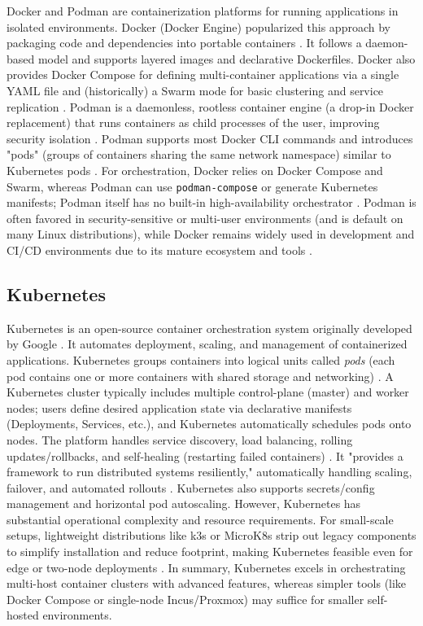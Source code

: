 Docker and Podman are containerization platforms for running applications in isolated environments. Docker (Docker Engine) popularized this approach by packaging code and dependencies into portable containers \cite{SpaceliftPodmanDocker2024}. It follows a daemon-based model and supports layered images and declarative Dockerfiles. Docker also provides Docker Compose for defining multi-container applications via a single YAML file and (historically) a Swarm mode for basic clustering and service replication \cite{SpaceliftPodmanDocker2024}. Podman is a daemonless, rootless container engine (a drop-in Docker replacement) that runs containers as child processes of the user, improving security isolation \cite{SpaceliftPodmanDocker2024}. Podman supports most Docker CLI commands and introduces "pods" (groups of containers sharing the same network namespace) similar to Kubernetes pods \cite{SpaceliftPodmanDocker2024}. For orchestration, Docker relies on Docker Compose and Swarm, whereas Podman can use \texttt{podman-compose} or generate Kubernetes manifests; Podman itself has no built-in high-availability orchestrator \cite{SpaceliftPodmanDocker2024}. Podman is often favored in security-sensitive or multi-user environments (and is default on many Linux distributions), while Docker remains widely used in development and CI/CD environments due to its mature ecosystem and tools \cite{SpaceliftPodmanDocker2024}.

\subsection*{Kubernetes}

Kubernetes is an open-source container orchestration system originally developed by Google \cite{KubernetesHome2023}. It automates deployment, scaling, and management of containerized applications. Kubernetes groups containers into logical units called \emph{pods} (each pod contains one or more containers with shared storage and networking) \cite{KubernetesHome2023}\cite{KubernetesPods2025}. A Kubernetes cluster typically includes multiple control-plane (master) and worker nodes; users define desired application state via declarative manifests (Deployments, Services, etc.), and Kubernetes automatically schedules pods onto nodes. The platform handles service discovery, load balancing, rolling updates/rollbacks, and self-healing (restarting failed containers) \cite{KubernetesDocs2025}. It "provides a framework to run distributed systems resiliently," automatically handling scaling, failover, and automated rollouts \cite{KubernetesDocs2025}. Kubernetes also supports secrets/config management and horizontal pod autoscaling. However, Kubernetes has substantial operational complexity and resource requirements. For small-scale setups, lightweight distributions like k3s or MicroK8s strip out legacy components to simplify installation and reduce footprint, making Kubernetes feasible even for edge or two-node deployments \cite{K3sMicroK8s2022}. In summary, Kubernetes excels in orchestrating multi-host container clusters with advanced features, whereas simpler tools (like Docker Compose or single-node Incus/Proxmox) may suffice for smaller self-hosted environments.

